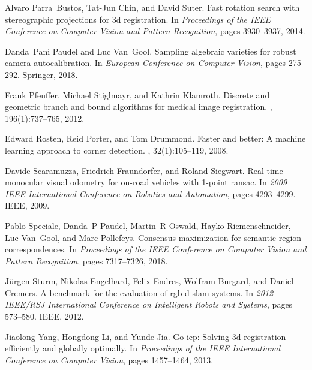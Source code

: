 \documentclass[letterpaper, 10 pt, conference]{ieeeconf}  %
\begin{document}
\begin{thebibliography}{10}
	Alvaro Parra~Bustos, Tat-Jun Chin, and David Suter.
	\newblock Fast rotation search with stereographic projections for 3d
	  registration.
	\newblock In {\em Proceedings of the IEEE Conference on Computer Vision and
	  Pattern Recognition}, pages 3930--3937, 2014.
	
	Danda~Pani Paudel and Luc Van~Gool.
	\newblock Sampling algebraic varieties for robust camera autocalibration.
	\newblock In {\em European Conference on Computer Vision}, pages 275--292.
	  Springer, 2018.
	
	Frank Pfeuffer, Michael Stiglmayr, and Kathrin Klamroth.
	\newblock Discrete and geometric branch and bound algorithms for medical image
	  registration.
	, 196(1):737--765, 2012.
	
	Edward Rosten, Reid Porter, and Tom Drummond.
	\newblock Faster and better: A machine learning approach to corner detection.
	,
	  32(1):105--119, 2008.
	
	Davide Scaramuzza, Friedrich Fraundorfer, and Roland Siegwart.
	\newblock Real-time monocular visual odometry for on-road vehicles with 1-point
	  ransac.
	\newblock In {\em 2009 IEEE International Conference on Robotics and
	  Automation}, pages 4293--4299. IEEE, 2009.
	
	Pablo Speciale, Danda~P Paudel, Martin~R Oswald, Hayko Riemenschneider, Luc
	  Van~Gool, and Marc Pollefeys.
	\newblock Consensus maximization for semantic region correspondences.
	\newblock In {\em Proceedings of the IEEE Conference on Computer Vision and
	  Pattern Recognition}, pages 7317--7326, 2018.
	
	J{\"u}rgen Sturm, Nikolas Engelhard, Felix Endres, Wolfram Burgard, and Daniel
	  Cremers.
	\newblock A benchmark for the evaluation of rgb-d slam systems.
	\newblock In {\em 2012 IEEE/RSJ International Conference on Intelligent Robots
	  and Systems}, pages 573--580. IEEE, 2012.
	
	Jiaolong Yang, Hongdong Li, and Yunde Jia.
	\newblock Go-icp: Solving 3d registration efficiently and globally optimally.
	\newblock In {\em Proceedings of the IEEE International Conference on Computer
	  Vision}, pages 1457--1464, 2013.
	
\end{thebibliography}

\end{document}
